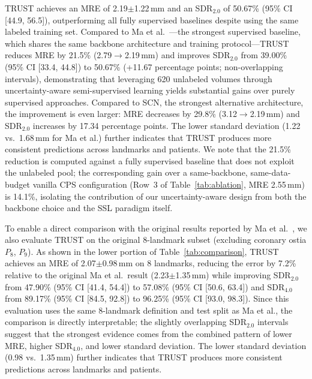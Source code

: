 \documentclass[conference]{IEEEtran}
\begin{document}
TRUST achieves an MRE of 2.19$\pm$1.22\,mm and an SDR$_{2.0}$ of 50.67\% (95\% CI [44.9, 56.5]), outperforming all fully supervised baselines despite using the same labeled training set. Compared to Ma et al.~\cite{Ma2023_aortic_landmarks}---the strongest supervised baseline, which shares the same backbone architecture and training protocol---TRUST reduces MRE by 21.5\% (2.79$\to$2.19\,mm) and improves SDR$_{2.0}$ from 39.00\% (95\% CI [33.4, 44.8]) to 50.67\% (+11.67 percentage points; non-overlapping intervals), demonstrating that leveraging 620 unlabeled volumes through uncertainty-aware semi-supervised learning yields substantial gains over purely supervised approaches. Compared to SCN, the strongest alternative architecture, the improvement is even larger: MRE decreases by 29.8\% (3.12$\to$2.19\,mm) and SDR$_{2.0}$ increases by 17.34 percentage points. The lower standard deviation (1.22 vs.\ 1.68\,mm for Ma et al.) further indicates that TRUST produces more consistent predictions across landmarks and patients. We note that the 21.5\% reduction is computed against a fully supervised baseline that does not exploit the unlabeled pool; the corresponding gain over a same-backbone, same-data-budget vanilla CPS configuration (Row~3 of Table~\ref{tab:ablation}, MRE 2.55\,mm) is 14.1\%, isolating the contribution of our uncertainty-aware design from both the backbone choice and the SSL paradigm itself.

To enable a direct comparison with the original results reported by Ma et al.~\cite{Ma2023_aortic_landmarks}, we also evaluate TRUST on the original 8-landmark subset (excluding coronary ostia $P_8$, $P_9$). As shown in the lower portion of Table~\ref{tab:comparison}, TRUST achieves an MRE of 2.07$\pm$0.98\,mm on 8 landmarks, reducing the error by 7.2\% relative to the original Ma et al.\ result (2.23$\pm$1.35\,mm) while improving SDR$_{2.0}$ from 47.90\% (95\% CI [41.4, 54.4]) to 57.08\% (95\% CI [50.6, 63.4]) and SDR$_{4.0}$ from 89.17\% (95\% CI [84.5, 92.8]) to 96.25\% (95\% CI [93.0, 98.3]). Since this evaluation uses the same 8-landmark definition and test split as Ma et al., the comparison is directly interpretable; the slightly overlapping SDR$_{2.0}$ intervals suggest that the strongest evidence comes from the combined pattern of lower MRE, higher SDR$_{4.0}$, and lower standard deviation. The lower standard deviation (0.98 vs.\ 1.35\,mm) further indicates that TRUST produces more consistent predictions across landmarks and patients.

\end{document}
